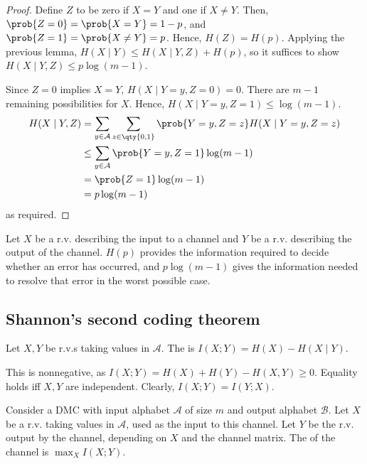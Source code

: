 \begin{proof}
    Define $Z$ to be zero if $X = Y$ and one if $X \neq Y$.
    Then, $\prob{Z = 0} = \prob{X = Y} = 1 - p$, and $\prob{Z = 1} = \prob{X \neq Y} = p$.
    Hence, $H(Z) = H(p)$.
    Applying the previous lemma, $H(X \mid Y) \leq H(X \mid Y, Z) + H(p)$, so it suffices to show $H(X \mid Y, Z) \leq p\log(m-1)$.

    Since $Z = 0$ implies $X = Y$, $H(X \mid Y = y, Z = 0) = 0$.
    There are $m - 1$ remaining possibilities for $X$.
    Hence, $H(X \mid Y = y, Z = 1) \leq \log(m-1)$.
    \begin{align*}
        H(X \mid Y, Z) &= \sum_{y \in \mathcal A} \sum_{z \in \qty{0,1}} \prob{Y = y, Z = z} H(X \mid Y = y, Z = z) \\
        &\leq \sum_{y \in \mathcal A} \prob{Y = y, Z = 1} \log(m-1) \\
        &= \prob{Z = 1} \log (m-1) \\
        &= p\log(m-1)
    \end{align*}
    as required.
\end{proof}

Let $X$ be a r.v. describing the input to a channel and $Y$ be a r.v. describing the output of the channel.
$H(p)$ provides the information required to decide whether an error has occurred, and $p\log(m-1)$ gives the information needed to resolve that error in the worst possible case.

\subsection{Shannon's second coding theorem}
\begin{definition}
    Let $X, Y$ be r.v.s taking values in $\mathcal A$.
    The  is $I(X;Y) = H(X) - H(X \mid Y)$.
\end{definition}

This is nonnegative, as $I(X;Y) = H(X) + H(Y) - H(X,Y) \geq 0$.
Equality holds iff $X, Y$ are independent.
Clearly, $I(X;Y) = I(Y;X)$.

\begin{definition}
    Consider a DMC with input alphabet $\mathcal A$ of size $m$ and output alphabet $\mathcal B$.
    Let $X$ be a r.v. taking values in $\mathcal A$, used as the input to this channel.
    Let $Y$ be the r.v. output by the channel, depending on $X$ and the channel matrix.
    The  of the channel is $\max_{X} I(X;Y)$.
\end{definition}

